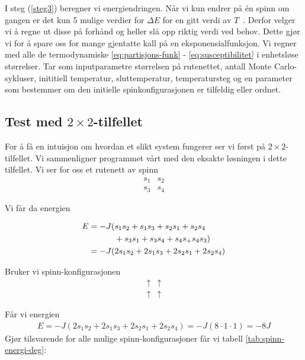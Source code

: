 \documentclass[11pt]{article}
\begin{document}
I steg (\ref{steg3}) beregner vi energiendringen. Når vi kun endrer på
én spinn om gangen er det kun 5 mulige verdier for $\Delta E$ for en
gitt verdi av $T$~\cite[s. 436]{Lecture-notes}. Derfor velger vi å
regne ut disse på forhånd og heller slå opp riktig verdi ved
behov. Dette gjør vi for å spare oss for mange gjentatte kall på en
eksponensialfunksjon. Vi regner med alle de termodynamiske \ref{eq:partisjons-funk} - \ref{eq:susceptibilitet}
 i enhetsløse størrelser. Tar som inputparametre størrelsen på rutenettet, antall Monte Carlo-sykluser,
inititiell temperatur, sluttemperatur, temperatursteg og en parameter som bestemmer om den initielle
spinkonfigurasjonen er tilfeldig eller ordnet.

\subsection{Test med $2 \times 2$-tilfellet}
For å få en intuisjon om hvordan et slikt system fungerer ser vi først på 
$2 \times 2$-tilfellet. Vi sammenligner programmet vårt med den 
eksakte løsningen i dette tilfellet. Vi ser for oss et rutenett av spinn
\begin{align*}
s_1 & s_2 \\
s_3 & s_4  
\end{align*}

Vi får da energien

\begin{align*}
E &= -J ( s_1s_2 + s_1s_3 + s_2s_1 + s_2s_4 \\
&  \hspace{1.1cm}+ s_3s_1 + s_3s_4 + s_4s_ + s_4s_3) \\ 
&= - J  ( 2s_1s_2 + 2s_1s_3 + 2s_2s_1 + 2s_2s_4 ) 
\end{align*}

Bruker vi spinn-konfigurasjonen
\begin{align*}
\uparrow & \uparrow \\
\uparrow & \uparrow
\end{align*}

Får vi energien 
\begin{align*}
E = - J  ( 2s_1s_2 + 2s_1s_3 + 2s_2s_1 + 2s_2s_4 ) = -J ( 8 \cdot 1 \cdot 1) = -8J  
\end{align*}
Gjør tilsvarende for alle mulige spinn-konfigurasjoner får vi tabell \ref{tab:spinn-energi-deg}:
\end{document}
